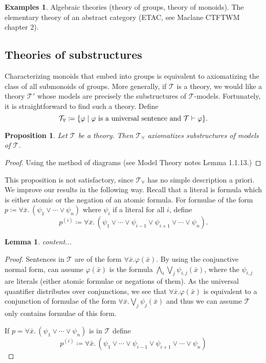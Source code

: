 \documentclass{article}
\theoremstyle{plain}
\newtheorem{prop}[thm]{Proposition}
\newtheorem{lem}[thm]{Lemma}
\theoremstyle{definition}
\newtheorem{egs}[thm]{Examples}
\begin{document}
	\begin{egs}
		Algebraic theories (theory of groups, theory of monoids). The elementary theory of an abstract category (ETAC, see Maclane CTFTWM chapter 2).
	\end{egs}
	\subsection{Theories of substructures}
	Characterizing monoids that embed into groups is equivalent to axiomatizing the class of all submonoids of groups. More generally, if $\mathcal{T}$ is a theory, we would like a theory $\mathcal{T}'$ whose models are precisely the substructures of $\mathcal{T}$-models. Fortunately, it is straightforward to find such a theory. Define
	\[
		\mathcal{T}_{\forall}\coloneqq \{\varphi \mid \varphi\textnormal{ is a universal sentence and }\mathcal{T}\vdash \varphi\}.
	\]
	\begin{prop}
		Let $\mathcal{T}$ be a theory. Then $\mathcal{T}_{\forall}$ axiomatizes substructures of models of $\mathcal{T}$.
	\end{prop}
	\begin{proof}
		Using the method of diagrams (see Model Theory notes Lemma 1.1.13.)
	\end{proof}
	
	This proposition is not satisfactory, since $\mathcal{T}_{\forall}$ has no simple description a priori. We improve our results in the following way. Recall that a literal is formula which is either atomic or the negation of an atomic formula. For formulae of the form $p \coloneqq \forall \bar{x}.\, (\psi_1\vee \cdots \vee \psi_n)$ where $\psi_i$ if a literal for all $i$, define 
	\[p^{(i)} \coloneqq \forall \bar{x}.\,(\psi_1 \vee\cdots \vee \psi_{i-1}\vee \psi_{i+1}\vee \cdots\vee \psi_{n}).\]
	
	\begin{lem}
		content...
	\end{lem}
	\begin{proof}
		Sentences in $\mathcal{T}$ are of the form $\forall \bar{x}. \varphi(\bar{x})$. By using the conjunctive normal form, can assume $\varphi(\bar{x})$ is the formula $\bigwedge_{i}\bigvee_j \psi_{i,j}(\bar{x})$, where the $\psi_{i,j}$ are literals (either atomic formulae or negations of them). As the universal quantifier distributes over conjunctions, we see that $\forall \bar{x}. \varphi(\bar{x})$ is equivalent to a conjunction of formulae of the form $\forall \bar{x}. \bigvee_j \psi_{j}(\bar{x})$ and thus we can assume $\mathcal{T}$ only contains formulae of this form.
		
		If $p = \forall \bar{x}.\, (\psi_1\vee \cdots \vee \psi_n)$ is in $\mathcal{T}$ define 
		\[p^{(i)} \coloneqq \forall \bar{x}.\,(\psi_1 \vee\cdots \vee \psi_{i-1}\vee \psi_{i+1}\vee \cdots\vee \psi_{n})\]
	\end{proof}
	
\end{document}
